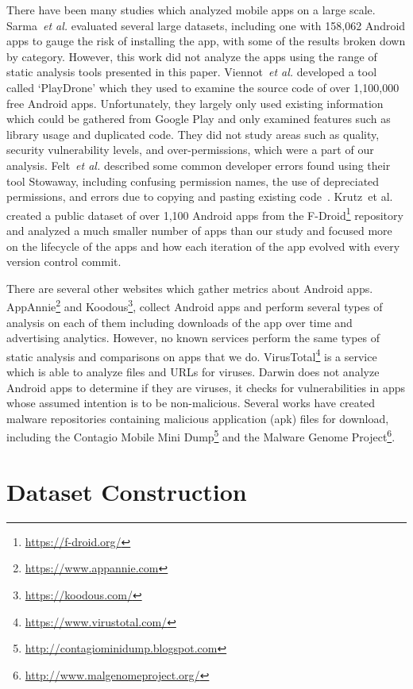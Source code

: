 \documentclass{sig-alternate-05-2015}
\begin{document}
There have been many studies which analyzed mobile apps on a large scale. Sarma~\emph{et al.}\cite{Sarma:2012:APP:2295136.2295141} evaluated several large datasets, including one with 158,062 Android apps to gauge the risk of installing the app, with some of the results broken down by category. However, this work did not analyze the apps using the range of static analysis tools presented in this paper. Viennot~\emph{et al.}\cite{Viennot:2014:MSG:2637364.2592003} developed a tool called `PlayDrone' which they used to examine the source code of over 1,100,000 free Android apps. Unfortunately, they largely only used existing information which could be gathered from Google Play and only examined features such as library usage and duplicated code. They did not study areas such as quality, security vulnerability levels, and over-permissions, which were a part of our analysis. Felt~\emph{et al.} described some common developer errors found using their tool Stowaway, including confusing permission names, the use of depreciated permissions, and errors due to copying and pasting existing code~\cite{Felt:2011:APD:2046707.2046779}. Krutz~et al.\cite{krutz2015FDroid} created a public dataset of over 1,100 Android apps from the F-Droid\footnote{\url{https://f-droid.org/}} repository and analyzed a much smaller number of apps than our study and focused more on the lifecycle of the apps and how each iteration of the app evolved with every version control commit.

There are several other websites which gather metrics about Android apps. AppAnnie\footnote{\url{https://www.appannie.com}} and Koodous\footnote{\url{https://koodous.com/}}, collect Android apps and perform several types of analysis on each of them including downloads of the app over time and advertising analytics. However, no known services perform the same types of static analysis and comparisons on apps that we do. VirusTotal\footnote{\url{ https://www.virustotal.com/}} is a service which is able to analyze files and URLs for viruses. Darwin does not analyze Android apps to determine if they are viruses, it checks for vulnerabilities in apps whose assumed intention is to be non-malicious. Several works have created malware repositories containing malicious application (apk) files for download, including the Contagio Mobile Mini Dump\footnote{\url{http://contagiominidump.blogspot.com}} and the Malware Genome Project\footnote{\url{http://www.malgenomeproject.org/}}.


\section{Dataset Construction}
\label{sec: datasetconstruction}
\end{document}
